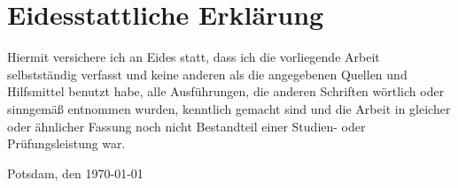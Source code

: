 \pagebreak
\thispagestyle{empty}
\section*{Eidesstattliche Erklärung}

Hiermit versichere ich an Eides statt, dass ich die vorliegende Arbeit selbstständig verfasst und keine anderen als die angegebenen Quellen und Hilfsmittel benutzt habe, alle Ausführungen, die anderen Schriften wörtlich oder sinngemäß entnommen wurden, kenntlich gemacht sind und die Arbeit in gleicher oder ähnlicher Fassung noch nicht Bestandteil einer Studien- oder Prüfungsleistung war.

Potsdam, den \today \hfill \autorname